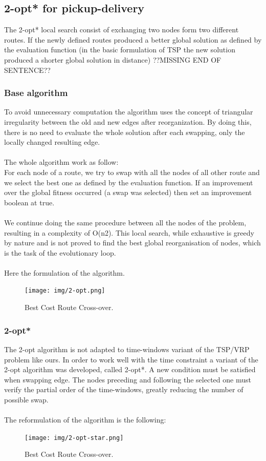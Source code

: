 \documentclass[12pt]{memoir}
\begin{document}
\subsection{2-opt* for pickup-delivery}
The 2-opt* local search consist of exchanging two nodes form two different routes. If the newly defined routes
produced a better global solution as defined by the evaluation function (in the basic formulation of TSP
the new solution produced a shorter global solution in distance) ??MISSING END OF SENTENCE??


\subsubsection{Base algorithm}
To avoid unnecessary computation the algorithm uses the concept of triangular irregularity
between the old and new edges after reorganization. By doing this, there is no need to
evaluate the whole solution after each swapping, only the locally changed resulting edge.\\
\\
The whole algorithm work as follow:\\
For each node of a route, we try to swap with all the nodes of all other route and we
select the best one as defined by the evaluation function. If an improvement over the global
fitness occurred (a swap was selected) then set an improvement boolean at true.\\
\\
We continue doing the same procedure between all the nodes of the problem, resulting in a
complexity of O(n2). This local search, while exhaustive is greedy by nature and is not proved
to find the best global reorganisation of nodes, which is the task of the evolutionary loop.\\
\\
Here the formulation of the algorithm.
\begin{figure}[htbp]
	\begin{center}
		\texttt{[image: img/2-opt.png]}
		\caption{Best Cost Route Cross-over.}
	\end{center}
\end{figure}
\subsubsection{2-opt*}
The 2-opt algorithm is not adapted to time-windows variant of the TSP/VRP problem like ours.
In order to work well with the time constraint a variant of the 2-opt algorithm was developed,
called 2-opt*. A new condition must be satisfied when swapping edge. The nodes preceding and
following the selected one must verify the partial order of the time-windows, greatly reducing
the number of possible swap.\\
\\
The reformulation of the algorithm is the following:
\begin{figure}[htbp]
	\begin{center}
		\texttt{[image: img/2-opt-star.png]}
		\caption{Best Cost Route Cross-over.}
	\end{center}
\end{figure}
\end{document}
